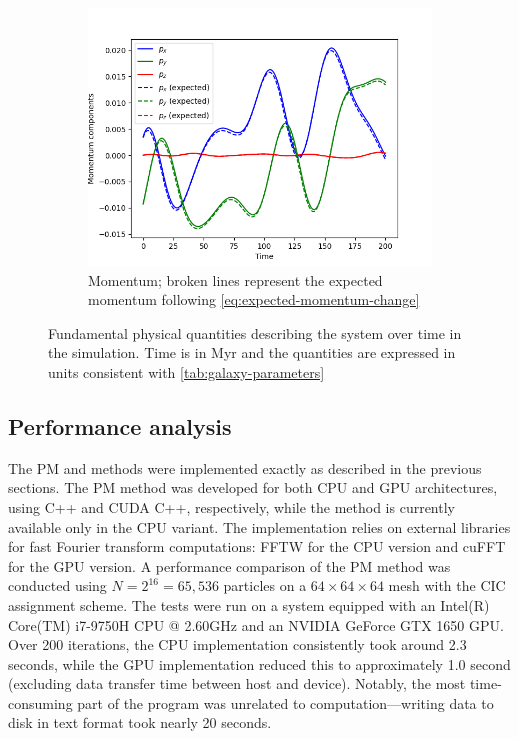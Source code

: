 \begin{figure}[htp]
    \vspace{0.5cm}

    \begin{subfigure}[b]{0.45\textwidth}
        \centering
        \includegraphics[width=\textwidth]{img/p3m/momentum.png}
        \caption{Momentum; broken lines represent the expected momentum following \autoref{eq:expected-momentum-change}}
        \label{fig:physical-quantities-p3m-sub3}
    \end{subfigure}

    \caption{Fundamental physical quantities describing the system over time in the \PThreeM{} simulation.
        Time is in Myr and the quantities are expressed in units consistent with \autoref{tab:galaxy-parameters}}
    \label{fig:physical-quantities-p3m}
\end{figure}

\subsection{Performance analysis}
The PM and \PThreeM{} methods were implemented exactly as described in the previous sections.
The PM method was developed for both CPU and GPU architectures, using C++ and CUDA C++, respectively, while the \PThreeM{} method is currently available only in the CPU variant.
The implementation relies on external libraries for fast Fourier transform computations: FFTW for the CPU version and cuFFT for the GPU version.
A performance comparison of the PM method was conducted using $N = 2^{16} = 65,536$ particles on a $64 \times 64 \times 64$ mesh with the CIC assignment scheme.
The tests were run on a system equipped with an Intel(R) Core(TM) i7-9750H CPU @ 2.60GHz and an NVIDIA GeForce GTX 1650 GPU. Over 200 iterations, the CPU implementation consistently took around 2.3 seconds, while the GPU implementation reduced this to approximately 1.0 second (excluding data transfer time between host and device).
Notably, the most time-consuming part of the program was unrelated to computation—writing data to disk in text format took nearly 20 seconds.

